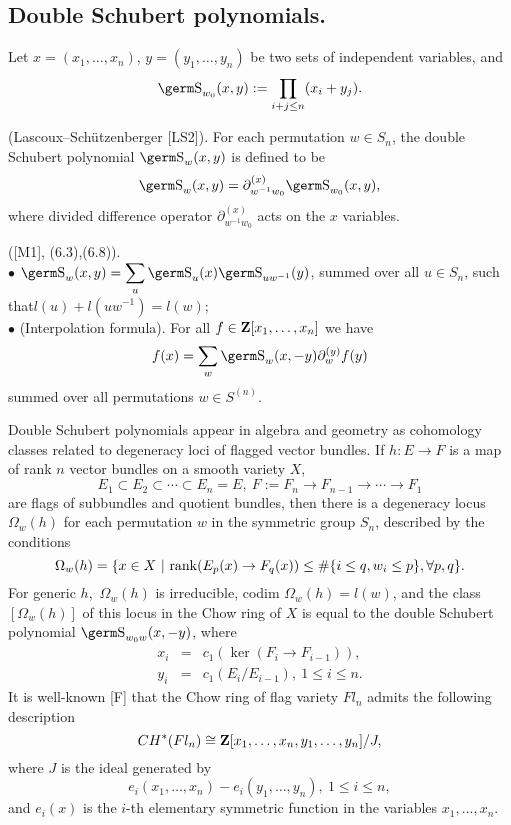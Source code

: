 {\subsection{Double Schubert polynomials.}

Let $x=(x_1,\ldots ,x_n)$, $y=(y_1,\ldots ,y_n)$ be two sets of 
independent variables, and
$$\s_{w_0}(x,y):=\prod_{i+j\le n}(x_i+y_j).
$$

\begin{de} (Lascoux--Sch\"utzenberger [LS2]).
For each permutation \hbox{$w\in S_n$,} the double Schubert polynomial 
$\s_w(x,y)$ is defined to be
$$\s_w(x,y)=\partial_{w^{-1}w_0}^{(x)}\s_{w_0}(x,y),
$$
where divided difference operator $\partial_{w^{-1}w_0}^{(x)}$ 
acts on the $x$ variables.
\end{de}

\begin{pr} ([M1], (6.3),(6.8)).\\
$\bullet$ $\s_w(x,y)=\ds\sum_u\s_u(x)\s_{uw^{-1}}(y)$, summed over all $u\in 
S_n$, such that\break $l(u)+l(uw^{-1})=l(w)$;\\
$\bullet$ (Interpolation formula). For all $f\in{\bf Z}[x_1,\ldots ,x_n]$ 
we have
$$f(x)=\sum_w\s_w(x,-y)\partial_w^{(y)}f(y)
$$
summed over all permutations $w\in S^{(n)}$.
\end{pr}

Double Schubert polynomials appear in algebra and geometry as cohomology 
classes related to degeneracy loci of flagged vector bundles. If $h:E\to 
F$ is a map of rank $n$ vector bundles on a smooth variety $X$,
$$E_1\subset E_2\subset\cdots\subset E_n=E, \ F:=F_n\to 
F_{n-1}\to \cdots \to F_1
$$
are flags of subbundles and quotient bundles, then there is a degeneracy 
locus $\Omega_w(h)$ for each permutation $w$ in the symmetric group 
$S_n$, described by the conditions
$$\Omega_w(h)=\{ x\in X~|~{\rm rank}(E_p(x)\to F_q(x))\le\#\{ i\le q, 
w_i\le p\} , \forall p,q\}.
$$
For generic $h$,\  $\Omega_w(h)$ is irreducible, codim $\Omega_w(h)=l(w)$, 
and the class $[\Omega_w(h)]$ of this locus in the Chow ring of $X$ is 
equal to the double Schubert polynomial $\s_{w_0w}(x,-y)$, where
\begin{eqnarray}  x_i &=& c_1(\ker (F_i\to F_{i-1})),\nonumber\\
y_i &=& c_1(E_i/E_{i-1}), \ 1\le i\le n.\nonumber
\end{eqnarray}
It is well-known [F] that the Chow ring of flag variety $Fl_n$ admits the 
following description
$$CH^*(Fl_n)\cong{\bf Z}[x_1,\ldots ,x_n,y_1,\ldots ,y_n]/J,
$$
where $J$ is the ideal generated by
$$e_i(x_1,\ldots ,x_n)-e_i(y_1,\ldots ,y_n), \ 1\le i\le n,
$$
and $e_i(x)$ is the $i$-th elementary symmetric function in the variables 
$x_1,\ldots ,x_n$.

}
